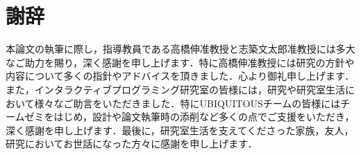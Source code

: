 \chapter*{謝辞}
本論文の執筆に際し，指導教員である高橋伸准教授と志築文太郎准教授には多大なご助力を賜り，深く感謝を申し上げます．特に高橋伸准教授には研究の方針や内容について多くの指針やアドバイスを頂きました．心より御礼申し上げます．また，インタラクティブプログラミング研究室の皆様には，研究や研究室生活において様々なご助言をいただきました．特にUBIQUITOUSチームの皆様にはチームゼミをはじめ，設計や論文執筆時の添削など多くの点でご支援をいただき，深く感謝を申し上げます．最後に，研究室生活を支えてくださった家族，友人，研究においてお世話になった方々に感謝を申し上げます．